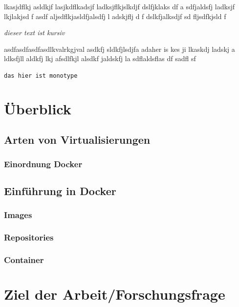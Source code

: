 \documentclass[11pt,a4paper,oneside]{report}
\begin{document}
lkasjdflkj asldkjf lasjkdflkadsjf ladksjflkjslkdjf    dslfjklaks df a sdfjaldsfj  ladksjf lkjlakjsd f asdf aljsdflkjasldfjalsdfj l adskjflj d f dslkfjalksdjf sd fljsdfkjsld f

\emph{dieser text ist kursiv}

asdfasdfasdfasdlkvalrkgjval  asdkfj  sldkfjlsdjfa adaher is kes ji lkaskdj ladskj a ldksfjll aldkfj lkj afsdlfkjl alsdkf jaldskfj la sdflaldsflas df sadfl sf

\texttt{das hier ist monotype}




\chapter{Überblick}
	\section{Arten von Virtualisierungen}
	  \subsection{Einordnung Docker}
  \section{Einführung in Docker}
    \subsection{Images}
    \subsection{Repositories}
    \subsection{Container}
\chapter{Ziel der Arbeit/Forschungsfrage}
\end{document}

